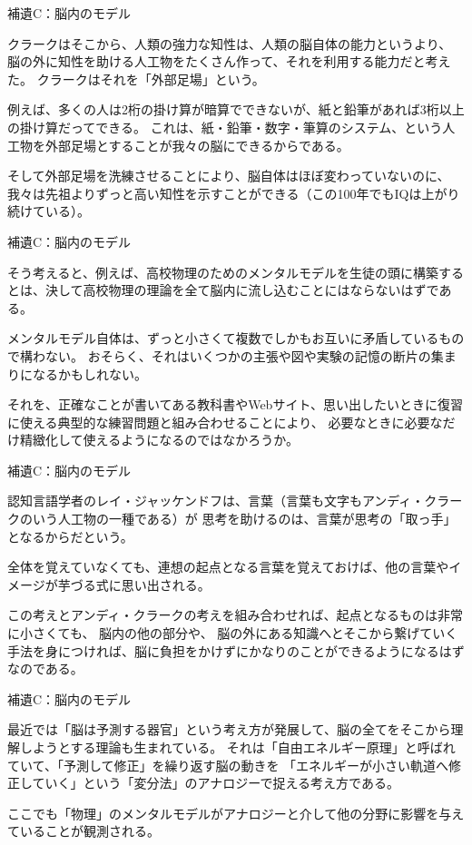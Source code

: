 \documentclass[12pt, unicode]{beamer}
\begin{document}
\begin{frame}{補遺C：脳内のモデル}

クラークはそこから、人類の強力な知性は、人類の脳自体の能力というより、
脳の外に知性を助ける人工物をたくさん作って、それを利用する能力だと考えた。
クラークはそれを「外部足場」という。

例えば、多くの人は2桁の掛け算が暗算でできないが、紙と鉛筆があれば3桁以上の掛け算だってできる。
これは、紙・鉛筆・数字・筆算のシステム、という人工物を外部足場とすることが我々の脳にできるからである。

そして外部足場を洗練させることにより、脳自体はほぼ変わっていないのに、
我々は先祖よりずっと高い知性を示すことができる（この100年でもIQは上がり続けている）。

\end{frame}

\begin{frame}{補遺C：脳内のモデル}

そう考えると、例えば、高校物理のためのメンタルモデルを生徒の頭に構築するとは、決して高校物理の理論を全て脳内に流し込むことにはならないはずである。

メンタルモデル自体は、ずっと小さくて複数でしかもお互いに矛盾しているもので構わない。
おそらく、それはいくつかの主張や図や実験の記憶の断片の集まりになるかもしれない。

それを、正確なことが書いてある教科書やWebサイト、思い出したいときに復習に使える典型的な練習問題と組み合わせることにより、
必要なときに必要なだけ精緻化して使えるようになるのではなかろうか。

\end{frame}

\begin{frame}{補遺C：脳内のモデル}

認知言語学者のレイ・ジャッケンドフは、言葉（言葉も文字もアンディ・クラークのいう人工物の一種である）が
思考を助けるのは、言葉が思考の「取っ手」となるからだという。

全体を覚えていなくても、連想の起点となる言葉を覚えておけば、他の言葉やイメージが芋づる式に思い出される。

この考えとアンディ・クラークの考えを組み合わせれば、起点となるものは非常に小さくても、
脳内の他の部分や、
脳の外にある知識へとそこから繋げていく手法を身につければ、脳に負担をかけずにかなりのことができるようになるはずなのである。

\end{frame}

\begin{frame}{補遺C：脳内のモデル}

最近では「脳は予測する器官」という考え方が発展して、脳の全てをそこから理解しようとする理論も生まれている。
それは「自由エネルギー原理」と呼ばれていて、「予測して修正」を繰り返す脳の動きを
「エネルギーが小さい軌道へ修正していく」という「変分法」のアナロジーで捉える考え方である。

ここでも「物理」のメンタルモデルがアナロジーと介して他の分野に影響を与えていることが観測される。

\end{frame}
\end{document}
